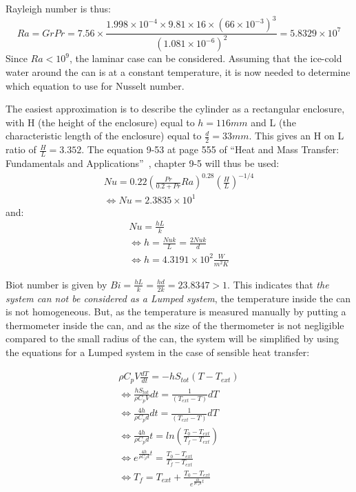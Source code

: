 \documentclass{report}
\begin{document}
	
	Rayleigh number is thus: 
	\begin{equation}
		Ra = GrPr= 7.56\times \frac{1.998\times 10^{-4}\times 9.81\times 16\times (66\times 10^{-3})^3}{(1.081\times 10^{-6})^2}= 5.8329\times 10^{7}
	\end{equation}
	Since $Ra<10^9$, the laminar case can be considered. Assuming that the ice-cold water around the can is at a constant temperature, it is now needed to determine which equation to use for Nusselt number.
	
	The easiest approximation is to describe the cylinder as a rectangular enclosure, with H (the height of the enclosure) equal to $h=116mm$ and L (the characteristic length of the enclosure) equal to $\frac{d}{2}=33mm$. This gives an H on L ratio of $\frac{H}{L}=3.352$. The equation 9-53 at page 555 of ``Heat and Mass Transfer: Fundamentals and Applications''~\cite{HaMT}, chapter 9-5 will thus be used:
	\begin{equation}
		\begin{gathered}
			Nu=0.22(\frac{Pr}{0.2+Pr}Ra)^{0.28}(\frac{H}{L})^{-1/4}\\
			\Leftrightarrow Nu=2.3835\times 10^{1}
		\end{gathered}	
	\end{equation}
	and:
	\begin{equation}
		\begin{gathered}
			Nu=\frac{hL}{k}\\
			\Leftrightarrow h=\frac{Nu k}{L}=\frac{2Nu k}{d}\\
			\Leftrightarrow h=4.3191\times 10^2 \frac{W}{m^2K}
		\end{gathered}	
	\end{equation}
	
	Biot number is given by $Bi=\frac{hL}{k}=\frac{hd}{2k}=23.8347 > 1$. This indicates that \emph{the system can not be considered as a Lumped system}, the temperature inside the can is not homogeneous. But, as the temperature is measured manually by putting a thermometer inside the can, and as the size of the thermometer is not negligible compared to the small radius of the can, the system will be simplified by using the equations for a Lumped system in the case of sensible heat transfer:
	
	\begin{equation}\label{lumped}
		\begin{gathered}
			\rho C_pV\frac{dT}{dt}=-hS_{tot}(T-T_{ext})\\
			\Leftrightarrow \frac{hS_{tot}}{\rho C_pV}dt=\frac{1}{(T_{ext}-T)}dT\\
			\Leftrightarrow \frac{4h}{\rho C_pd}dt=\frac{1}{(T_{ext}-T)}dT\\
			\Leftrightarrow \frac{4h}{\rho C_pd}t=ln(\frac{T_0-T_{ext}}{T_f-T_{ext}})\\
			\Leftrightarrow e^{\frac{4h}{\rho C_pd}t}=\frac{T_0-T_{ext}}{T_f-T_{ext}}\\
			\Leftrightarrow T_f=T_{ext}+\frac{T_0-T_{ext}}{e^{\frac{4h}{\rho C_pd}t}}
		\end{gathered}
	\end{equation}
	
\end{document}

